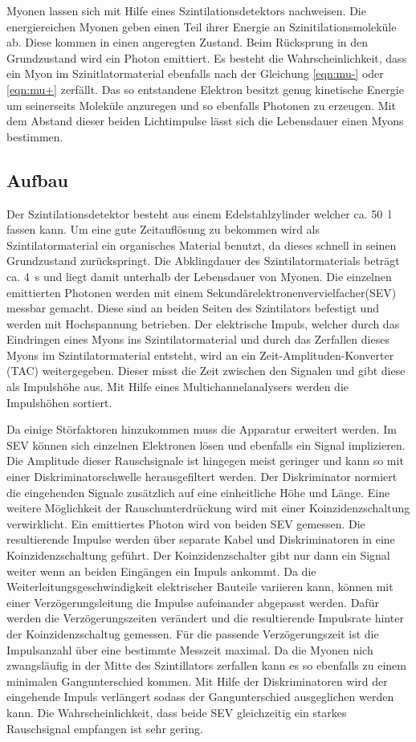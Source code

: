 Myonen lassen sich mit Hilfe eines Szintilationsdetektors nachweisen.
Die energiereichen Myonen geben einen Teil ihrer Energie an Szinitilationsmoleküle ab.
Diese kommen in einen angeregten Zustand.
Beim Rücksprung in den Grundzustand wird ein Photon emittiert.
Es besteht die Wahrscheinlichkeit, dass ein Myon im Szinitlatormaterial ebenfalls nach der Gleichung \ref{eqn:mu-}
oder \ref{eqn:mu+} zerfällt.
Das so entstandene Elektron besitzt genug kinetische Energie um seinerseits Moleküle anzuregen und so ebenfalls Photonen zu erzeugen.
Mit dem Abstand dieser beiden Lichtimpulse lässt sich die Lebensdauer einen Myons bestimmen.

\subsection{Aufbau}
Der Szintilationsdetektor besteht aus einem Edelstahlzylinder welcher ca. \SI{50}{l} fassen kann.
Um eine gute Zeitauflösung zu bekommen wird als Szintilatormaterial ein organisches Material benutzt,
da dieses schnell in seinen Grundzustand zurückspringt.
Die Abklingdauer des Szintilatormaterials beträgt ca. \SI{4}{s} und liegt damit unterhalb der Lebensdauer von Myonen.
Die einzelnen emittierten Photonen werden mit einem Sekundärelektronenvervielfacher(SEV) messbar gemacht.
Diese sind an beiden Seiten des Szintilators befestigt und werden mit Hochspannung betrieben.
Der elektrische Impuls, welcher durch das Eindringen eines Myons ins Szintilatormaterial
und durch das Zerfallen dieses Myons im Szintilatormaterial entsteht,
wird an ein Zeit-Amplituden-Konverter (TAC) weitergegeben.
Dieser misst die Zeit zwischen den Signalen und gibt diese als Impulshöhe aus.
Mit Hilfe eines Multichannelanalysers werden die Impulshöhen sortiert.

Da einige Störfaktoren hinzukommen muss die Apparatur erweitert werden.
Im SEV können sich einzelnen Elektronen lösen und ebenfalls ein Signal implizieren.
Die Amplitude dieser Rauschsignale ist hingegen meist geringer und kann so mit einer Diskriminatorschwelle herausgefiltert werden.
Der Diskriminator normiert die eingehenden Signale zusätzlich auf eine einheitliche Höhe und Länge.
Eine weitere Möglichkeit der Rauschunterdrückung wird mit einer Koinzidenzschaltung verwirklicht.
Ein emittiertes Photon wird von beiden SEV gemessen.
Die resultierende Impulse werden über separate Kabel und Diskriminatoren in eine Koinzidenzschaltung geführt.
Der Koinzidenzschalter gibt nur dann ein Signal weiter wenn an beiden Eingängen ein Impuls ankommt.
Da die Weiterleitungsgeschwindigkeit elektrischer Bauteile variieren kann,
können mit einer Verzögerungsleitung die Impulse aufeinander abgepasst werden.
Dafür werden die Verzögerungszeiten verändert und die resultierende Impulsrate hinter der Koinzidenzschaltug gemessen.
Für die passende Verzögerungszeit ist die Impulsanzahl über eine bestimmte Messzeit maximal.
Da die Myonen nich zwangsläufig in der Mitte des Szintillators zerfallen kann es so ebenfalls zu einem minimalen Gangunterschied kommen.
Mit Hilfe der Diskriminatoren wird der eingehende Impuls verlängert sodass der Gangunterschied ausgeglichen werden kann.
Die Wahrscheinlichkeit, dass beide SEV gleichzeitig ein starkes Rauschsignal empfangen ist sehr gering.


